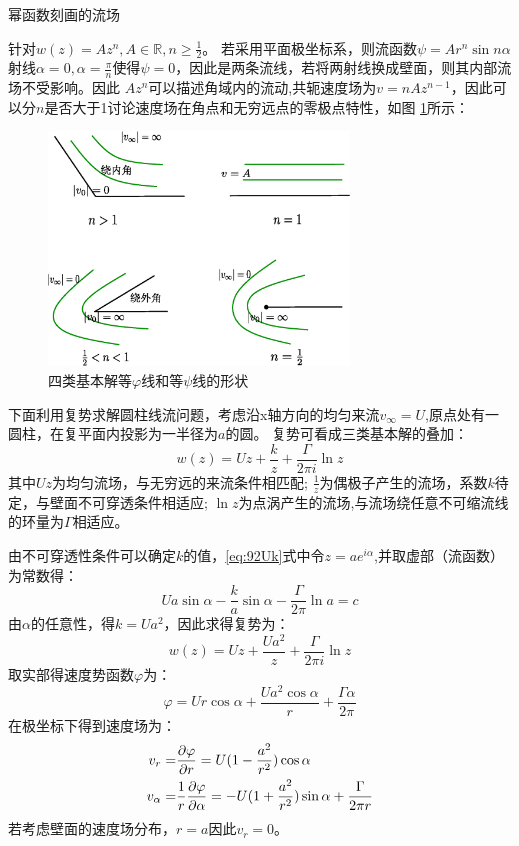 幂函数刻画的流场

针对$w(z)=Az^n,A\in \mathbb{R},n\geq \frac{1}{2}$。
若采用平面极坐标系，则流函数$\psi=Ar^n \sin n\alpha$
射线$\alpha=0,\alpha=\frac{\pi}{n}$使得$\psi=0$，因此是两条流线，若将两射线换成壁面，则其内部流场不受影响。因此
$Az^n$可以描述角域内的流动,共轭速度场为$v=nAz^{n-1}$，因此可以分$n$是否大于1讨论速度场在角点和无穷远点的零极点特性，如图
\ref{fig:powerComplexFunctionField}所示：

\begin{figure}[!ht]
 \centering
 \includegraphics[width=8cm]{powerComplexFunctionField.eps}
 \caption{四类基本解等$\varphi$线和等$\psi$线的形状}\label{fig:powerComplexFunctionField}
\end{figure}

下面利用复势求解圆柱线流问题，考虑沿x轴方向的均匀来流$v_{\infty}=U$,原点处有一圆柱，在复平面内投影为一半径为$a$的圆。
复势可看成三类基本解的叠加：
\begin{equation}\label{eq:92Uk}
w(z)=Uz+\frac{k}{z}+\frac{\Gamma}{2\pi i}\ln z
\end{equation}
其中$Uz$为均匀流场，与无穷远的来流条件相匹配;
$\frac{1}{z}$为偶极子产生的流场，系数$k$待定，与壁面不可穿透条件相适应;
$\ln z$为点涡产生的流场,与流场绕任意不可缩流线的环量为$\Gamma$相适应。

由不可穿透性条件可以确定$k$的值，\eqref{eq:92Uk}式中令$z=ae^{i\alpha}$,并取虚部（流函数）为常数得：
\begin{equation}
Ua\sin\alpha-\frac{k}{a}\sin\alpha-\frac{\Gamma}{2\pi}\ln a=c
\end{equation}
由$\alpha$的任意性，得$k=Ua^2$，因此求得复势为：
\begin{equation}
w(z)=Uz+\frac{Ua^2}{z}+\frac{\Gamma}{2\pi i}\ln z
\end{equation}
取实部得速度势函数$\varphi$为：
\begin{equation}
\varphi=Ur\cos\alpha+\frac{Ua^2\cos\alpha}{r}+\frac{\Gamma \alpha}{2\pi}
\end{equation}
在极坐标下得到速度场为：
\begin{align}\notag
v_r =& \frac{\partial \varphi}{\partial r}=U(1-\frac{a^2}{r^2})\cos\alpha\\
v_{\alpha} = & \frac{1}{r}\frac{\partial \varphi}{\partial \alpha}=-U(1+\frac{a^2}{r^2})\sin\alpha+\frac{\Gamma}{2\pi r}
\end{align}
若考虑壁面的速度场分布，$r=a$因此$v_r=0$。

